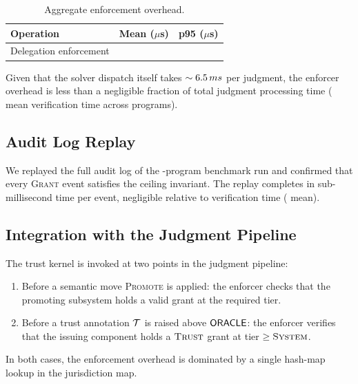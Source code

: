 \documentclass[11pt]{article}
\newcommand{\TierSYSTEM}{\textsc{System}}
\newcommand{\DomTRUST}{\textsc{Trust}}
\begin{document}
\begin{table}[h]
\centering
\caption{Aggregate enforcement overhead.}
\label{tab:overhead}
\begin{tabular}{lrr}
\toprule
Operation & Mean ($\mu$s) & p95 ($\mu$s) \\
\midrule
  Delegation enforcement & \ppNineteenMeanEnforceTime{} & \ppNineteenPninetyFiveEnforceTime{} \\
\bottomrule
\end{tabular}
\end{table}

Given that the \JuGeo{} solver dispatch itself takes
$\sim6.5\,ms{}$ per judgment, the enforcer overhead is less than
a negligible fraction of total judgment processing time
(\expTimeMean{} mean verification time across \expTotalPrograms{} programs).

\subsection{Audit Log Replay}

We replayed the full audit log of the \expTotalPrograms-program benchmark run
and confirmed that every \textsc{Grant} event satisfies the ceiling
invariant.  The replay completes in sub-millisecond time per event,
negligible relative to verification time (\expTimeMean{} mean).

\subsection{Integration with the Judgment Pipeline}

The trust kernel is invoked at two points in the \JuGeo{} judgment
pipeline:
\begin{enumerate}[leftmargin=1.5em,itemsep=2pt]
  \item Before a semantic move \textsc{Promote} is applied: the
        enforcer checks that the promoting subsystem holds a valid
        grant at the required tier.
  \item Before a trust annotation $\mathcal{T}$ is raised above
        $\mathsf{ORACLE}$: the enforcer verifies that the issuing component
        holds a $\DomTRUST$ grant at tier $\geq \TierSYSTEM$.
\end{enumerate}

In both cases, the enforcement overhead is dominated by a single
hash-map lookup in the jurisdiction map.

\end{document}
